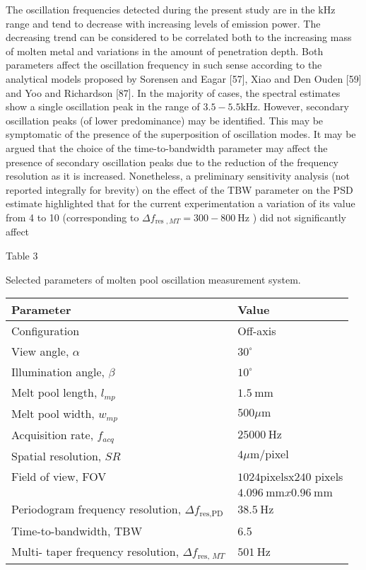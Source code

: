 \documentclass[10pt]{article}
\begin{document}
The oscillation frequencies detected during the present study are in the $\mathrm{kHz}$ range and tend to decrease with increasing levels of emission power. The decreasing trend can be considered to be correlated both to the increasing mass of molten metal and variations in the amount of penetration depth. Both parameters affect the oscillation frequency in such sense according to the analytical models proposed by Sorensen and Eagar [57], Xiao and Den Ouden [59] and Yoo and Richardson [87]. In the majority of cases, the spectral estimates show a single oscillation peak in the range of $3.5-5.5 \mathrm{kHz}$. However, secondary oscillation peaks (of lower predominance) may be identified. This may be symptomatic of the presence of the superposition of oscillation modes. It may be argued that the choice of the time-to-bandwidth parameter may affect the presence of secondary oscillation peaks due to the reduction of the frequency resolution as it is increased. Nonetheless, a preliminary sensitivity analysis (not reported integrally for brevity) on the effect of the TBW parameter on the PSD estimate highlighted that for the current experimentation a variation of its value from 4 to 10 (corresponding to $\Delta f_{\text {res }, M T}=300-800 \mathrm{~Hz}$ ) did not significantly affect

Table 3

Selected parameters of molten pool oscillation measurement system.

\begin{center}
\begin{tabular}{ll}
\hline
Parameter & Value \\
\hline
Configuration & Off-axis \\
View angle, $\alpha$ & $30^{\circ}$ \\
Illumination angle, $\beta$ & $10^{\circ}$ \\
Melt pool length, $l_{m p}$ & $1.5 \mathrm{~mm}$ \\
Melt pool width, $w_{m p}$ & $500 \mu \mathrm{m}$ \\
Acquisition rate, $f_{a c q}$ & $25000 \mathrm{~Hz}$ \\
Spatial resolution, $S R$ & $4 \mu \mathrm{m} / \mathrm{pixel}$ \\
Field of view, FOV & $1024 \mathrm{pixels} \mathrm{x} 240$ pixels \\
 & $4.096 \mathrm{~mm} x 0.96 \mathrm{~mm}$ \\
Periodogram frequency resolution, $\Delta f_{\text {res,PD }}$ & $38.5 \mathrm{~Hz}$ \\
Time-to-bandwidth, TBW & 6.5 \\
Multi- taper frequency resolution, $\Delta f_{\text {res, } M T}$ & $501 \mathrm{~Hz}$ \\
\hline
\end{tabular}
\end{center}
\end{document}
